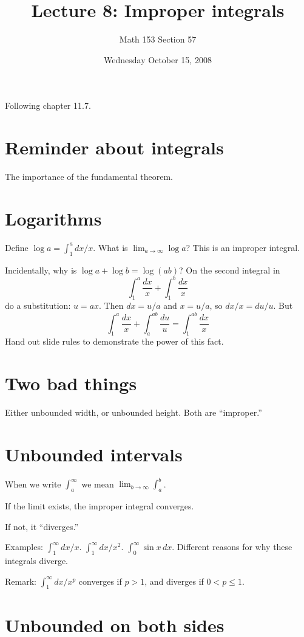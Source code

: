 \documentclass[12pt]{article}
\title{Lecture 8: Improper integrals}
\author{Math 153 Section 57}
\date{Wednesday October 15, 2008}
\begin{document}
\maketitle

Following chapter 11.7.

\section{Reminder about integrals}

The importance of the fundamental theorem.

\section{Logarithms}

Define $\log a = \int_1^a dx/x$.  What is $\lim_{a \to \infty} \log
a$?  This is an improper integral.

Incidentally, why is $\log a + \log b = \log (ab)$?  On the second
integral in
$$
\int_1^a \frac{dx}{x} + \int_1^b \frac{dx}{x}
$$
do a substitution: $u = ax$.  Then $dx = u/a$ and $x = u/a$, so $dx/x
= du/u$.  But
$$
\int_1^a \frac{dx}{x} + \int_{a}^{ab} \frac{du}{u} = \int_1^{ab} \frac{dx}{x}
$$
Hand out slide rules to demonstrate the power of this fact.

\section{Two bad things}

Either unbounded width, or unbounded height.  Both are ``improper.''

\section{Unbounded intervals}

When we write $\int_a^\infty$ we mean $\lim_{b \to \infty} \int_a^b$.

If the limit exists, the improper integral converges.

If not, it ``diverges.''

Examples: $\int_1^\infty dx/x$.  $\int_1^\infty dx/x^2$.  $\int_0^\infty \sin x\, dx$.  Different reasons for why these integrals diverge.

Remark: $\int_1^\infty dx / x^p$ converges if $p > 1$, and diverges if $0 < p \leq 1$.

\section{Unbounded on both sides}
\end{document}
